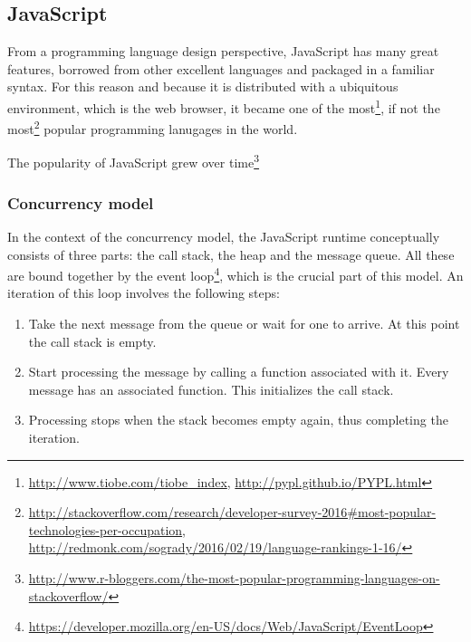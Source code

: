 \subsection{JavaScript}



From a programming language design perspective, JavaScript has many great features, borrowed from other excellent languages and packaged in a familiar syntax. For this reason and because it is distributed with a ubiquitous environment, which is the web browser, it became one of the most\footnote{\url{http://www.tiobe.com/tiobe_index}, \url{http://pypl.github.io/PYPL.html}}, if not the most\footnote{\url{http://stackoverflow.com/research/developer-survey-2016\#most-popular-technologies-per-occupation}, \url{http://redmonk.com/sogrady/2016/02/19/language-rankings-1-16/}} popular programming lanugages in the world.

The popularity of JavaScript grew over time\footnote{\url{http://www.r-bloggers.com/the-most-popular-programming-languages-on-stackoverflow/}}




\subsubsection{Concurrency model}
In the context of the concurrency model, the JavaScript runtime conceptually consists of three parts: the call stack, the heap and the message queue. All these are bound together by the event loop\footnote{\url{https://developer.mozilla.org/en-US/docs/Web/JavaScript/EventLoop}}, which is the crucial part of this model.
An iteration of this loop involves the following steps:
\begin{enumerate}
	\item Take the next message from the queue or wait for one to arrive. At this point the call stack is empty.
	\item Start processing the message by calling a function associated with it. Every message has an associated function. This initializes the call stack.
	\item Processing stops when the stack becomes empty again, thus completing the iteration.
\end{enumerate}

